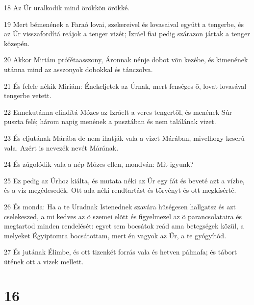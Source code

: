 \par 18 Az Úr uralkodik mind örökkön örökké.
\par 19 Mert bémenének a Faraó lovai, szekereivel és lovasaival együtt a tengerbe, és az Úr visszafordítá reájok a tenger vizét; Izráel fiai pedig szárazon jártak a tenger közepén.
\par 20 Akkor Miriám prófétaasszony, Áronnak nénje dobot võn kezébe, és kimenének utánna mind az asszonyok dobokkal és tánczolva.
\par 21 És felele nékik Miriám: Énekeljetek az Úrnak, mert fenséges õ, lovat lovasával tengerbe vetett.
\par 22 Ennekutánna elindítá Mózes az Izráelt a veres tengertõl, és menének Súr puszta felé; három napig menének a pusztában és nem találának vizet.
\par 23 És eljutának Márába de nem ihatják vala a vizet Márában, mivelhogy keserû vala. Azért is nevezék nevét Márának.
\par 24 És zúgolódik vala a nép Mózes ellen, mondván: Mit igyunk?
\par 25 Ez pedig az Úrhoz kiálta, és mutata néki az Úr egy fát és beveté azt a vízbe, és a víz megédesedék. Ott ada néki rendtartást és törvényt és ott megkísérté.
\par 26 És monda: Ha a te Uradnak Istenednek szavára hûségesen hallgatsz és azt cselekeszed, a mi kedves az õ szemei elõtt és figyelmezel az õ parancsolataira és megtartod minden rendelését: egyet sem bocsátok reád ama betegségek közül, a melyeket Égyiptomra bocsátottam, mert én vagyok az Úr, a te gyógyítód.
\par 27 És jutának Élimbe, és ott tizenkét forrás vala és hetven pálmafa; és tábort ütének ott a vizek mellett.

\chapter{16}

